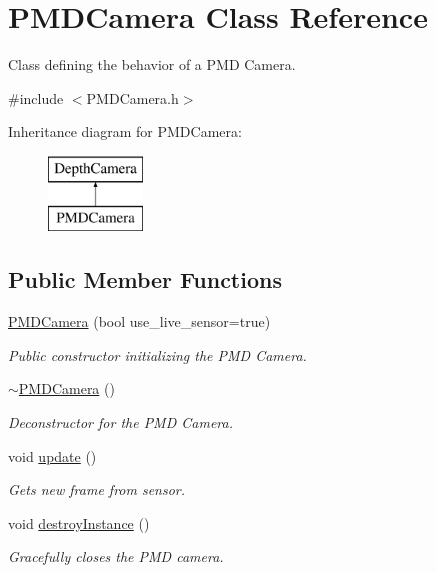 \hypertarget{class_p_m_d_camera}{}\section{P\+M\+D\+Camera Class Reference}
\label{class_p_m_d_camera}


Class defining the behavior of a P\+MD Camera.  




{\ttfamily \#include $<$P\+M\+D\+Camera.\+h$>$}

Inheritance diagram for P\+M\+D\+Camera\+:\begin{figure}[H]
\begin{center}
\leavevmode
\includegraphics[height=2.000000cm]{class_p_m_d_camera}
\end{center}
\end{figure}
\subsection*{Public Member Functions}
\begin{DoxyCompactItemize}
\item 
\hyperlink{class_p_m_d_camera_a9965c089ec7eea8537e249d432c1dbba}{P\+M\+D\+Camera} (bool use\+\_\+live\+\_\+sensor=true)
\begin{DoxyCompactList}\small\item\em Public constructor initializing the P\+MD Camera. \end{DoxyCompactList}\item 
\hyperlink{class_p_m_d_camera_a645cc6c2b05896c776bfdde5bc1aa1f0}{$\sim$\+P\+M\+D\+Camera} ()
\begin{DoxyCompactList}\small\item\em Deconstructor for the P\+MD Camera. \end{DoxyCompactList}\item 
void \hyperlink{class_p_m_d_camera_aa6cb9398f9635436b4384ee2043def40}{update} ()
\begin{DoxyCompactList}\small\item\em Gets new frame from sensor. \end{DoxyCompactList}\item 
void \hyperlink{class_p_m_d_camera_a13090aeffb98e1440e715a93e67d3c0e}{destroy\+Instance} ()
\begin{DoxyCompactList}\small\item\em Gracefully closes the P\+MD camera. \end{DoxyCompactList}\end{DoxyCompactItemize}
